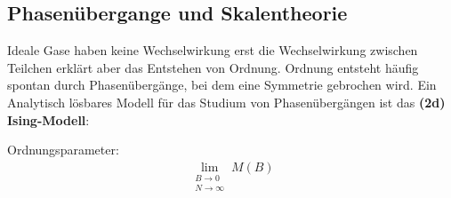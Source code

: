 \documentclass[12pt]{article}
\begin{document}
\subsection{Phasenübergange und Skalentheorie}

Ideale Gase haben keine Wechselwirkung erst die Wechselwirkung zwischen Teilchen erklärt aber das Entstehen von Ordnung. Ordnung entsteht häufig spontan durch Phasenübergänge, bei dem eine Symmetrie gebrochen wird. Ein Analytisch lösbares Modell für das Studium von Phasenübergängen ist das \textbf{ (2d) Ising-Modell}: %

Ordnungsparameter: 
\begin{align*}
 \lim\limits_{\substack{B \to 0 \\ N \to \infty}} M(B)
\end{align*}
\end{document}
